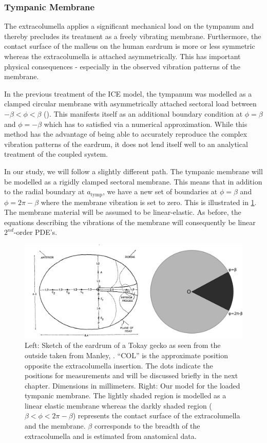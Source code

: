 \subsubsection{Tympanic Membrane}\label{tympanicmembrane}
The extracolumella applies a significant 
mechanical load on the tympanum and thereby precludes its treatment as a freely vibrating membrane. 
Furthermore, the contact surface of the malleus on the human eardrum is more or less symmetric whereas the 
extracolumella is attached asymmetrically. This has important physical consequences - especially in the 
observed vibration patterns of the membrane.

In the previous treatment of the ICE model, the tympanum was modelled as a clamped circular membrane with asymmetrically
attached sectoral load between $-\beta<\phi<\beta$ (\cite{vossenjasa}). This manifests itself as an additional
boundary condition at $\phi=\beta$ and $\phi=-\beta$ which has to satisfied via a numerical approximation. While
this method has the advantage of being able to accurately reproduce the complex vibration patterns of the eardrum, 
it does not lend itself well to an analytical treatment of the coupled system.

In our study, we will follow a slightly different path. The tympanic membrane will be modelled as a 
rigidly clamped sectoral membrane. This means that in addition to the radial boundary at $a_{\mathrm{tymp}}$,
we have a new set of boundaries at $\phi=\beta$ and $\phi=2\pi-\beta$ where the membrane vibration is set to zero. This is illustrated in \ref{tympanummodel}.
The membrane material will be assumed to be linear-elastic. As before, the equations describing the vibrations of the membrane will 
consequently be linear $2^{nd}$-order PDE's.
\begin{figure}[ht]
 \centering
 \includegraphics[width=.9\linewidth]{Diagrams/extracolumella2.png}
 \caption[Tympanic membrane model]{Left: Sketch of the eardrum of a Tokay gecko as seen from the outside taken from Manley, \cite{manleygecko1}. ``COL'' is
 the approximate position opposite the extracolumella insertion. The dots indicate the positions for measurements and will be discussed briefly in the
 next chapter. Dimensions
 in millimeters. Right: Our model for the loaded tympanic membrane. The lightly shaded region is modelled as a linear elastic membrane whereas the darkly shaded region 
 ($\beta<\phi<2\pi-\beta$) represents the contact surface of the extracolumella and the membrane. $\beta$ corresponds to the breadth of the extracolumella and is estimated from anatomical data.}
 \label{tympanummodel}
\end{figure}

